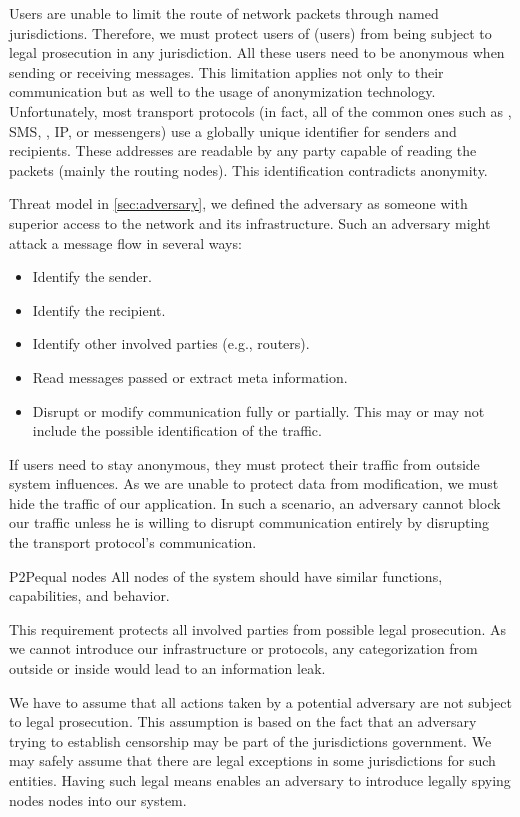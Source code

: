 Users are unable to limit the route of network packets through named jurisdictions. Therefore, we must protect users of \MessageVortex{} (users) from being subject to legal prosecution in any jurisdiction. All these users need to be anonymous when sending or receiving messages. This limitation applies not only to their communication but as well to the usage of anonymization technology. Unfortunately, most transport protocols (in fact, all of the common ones such as , SMS, , IP, or messengers) use a globally unique identifier for senders and recipients. These addresses are readable by any party capable of reading the packets (mainly the routing nodes).  This identification contradicts anonymity.

Threat model in \cref{sec:adversary}, we defined the adversary as someone with superior access to the network and its infrastructure. Such an adversary might attack a message flow in several ways:
\begin{itemize}
	\item Identify the sender.
	\item Identify the recipient.
	\item Identify other involved parties (e.g., routers).
	\item Read messages passed or extract meta information.
	\item Disrupt or modify communication fully or partially. This may or may not include the possible identification of the traffic.
\end{itemize}

If users need to stay anonymous, they must protect their traffic from outside system influences. As we are unable to protect data from modification, we must hide the traffic of our application. In such a scenario, an adversary cannot block our traffic unless he is willing to disrupt communication entirely by disrupting the transport protocol's communication. 

\begin{requirement}{P2P}{equal nodes}
	All nodes of the system should have similar functions, capabilities, and behavior.
\end{requirement}

This requirement protects all involved parties from possible legal prosecution. As we cannot introduce our infrastructure or protocols, any categorization from outside or inside would lead to an information leak. 

We have to assume that all actions taken by a potential adversary are not subject to legal prosecution. This assumption is based on the fact that an adversary trying to establish censorship may be part of the jurisdictions government. We may safely assume that there are legal exceptions in some jurisdictions for such entities. Having such legal means enables an adversary to introduce legally spying nodes nodes into our system.

